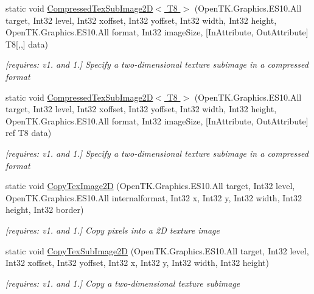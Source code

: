 \begin{DoxyCompactItemize}
static void \hyperlink{class_open_t_k_1_1_graphics_1_1_e_s10_1_1_g_l_ad5d51cd32ee94282e33250f4af2bd974}{Compressed\-Tex\-Sub\-Image2\-D$<$ T8 $>$} (Open\-T\-K.\-Graphics.\-E\-S10.\-All target, Int32 level, Int32 xoffset, Int32 yoffset, Int32 width, Int32 height, Open\-T\-K.\-Graphics.\-E\-S10.\-All format, Int32 image\-Size, \mbox{[}In\-Attribute, Out\-Attribute\mbox{]} T8\mbox{[},,\mbox{]} data)
\begin{DoxyCompactList}\small\item\em \mbox{[}requires\-: v1. and 1.\mbox{]} Specify a two-\/dimensional texture subimage in a compressed format \end{DoxyCompactList}\item 
static void \hyperlink{class_open_t_k_1_1_graphics_1_1_e_s10_1_1_g_l_aba823d2aca18dcc4fc7dff618af1efea}{Compressed\-Tex\-Sub\-Image2\-D$<$ T8 $>$} (Open\-T\-K.\-Graphics.\-E\-S10.\-All target, Int32 level, Int32 xoffset, Int32 yoffset, Int32 width, Int32 height, Open\-T\-K.\-Graphics.\-E\-S10.\-All format, Int32 image\-Size, \mbox{[}In\-Attribute, Out\-Attribute\mbox{]} ref T8 data)
\begin{DoxyCompactList}\small\item\em \mbox{[}requires\-: v1. and 1.\mbox{]} Specify a two-\/dimensional texture subimage in a compressed format \end{DoxyCompactList}\item 
static void \hyperlink{class_open_t_k_1_1_graphics_1_1_e_s10_1_1_g_l_a3811ae0fd1303feff2f1e4359d52b6f3}{Copy\-Tex\-Image2\-D} (Open\-T\-K.\-Graphics.\-E\-S10.\-All target, Int32 level, Open\-T\-K.\-Graphics.\-E\-S10.\-All internalformat, Int32 x, Int32 y, Int32 width, Int32 height, Int32 border)
\begin{DoxyCompactList}\small\item\em \mbox{[}requires\-: v1. and 1.\mbox{]} Copy pixels into a 2\-D texture image \end{DoxyCompactList}\item 
static void \hyperlink{class_open_t_k_1_1_graphics_1_1_e_s10_1_1_g_l_a41d89fb93ad1d93d864ae3761355c18a}{Copy\-Tex\-Sub\-Image2\-D} (Open\-T\-K.\-Graphics.\-E\-S10.\-All target, Int32 level, Int32 xoffset, Int32 yoffset, Int32 x, Int32 y, Int32 width, Int32 height)
\begin{DoxyCompactList}\small\item\em \mbox{[}requires\-: v1. and 1.\mbox{]} Copy a two-\/dimensional texture subimage \end{DoxyCompactList}\item 

\end{DoxyCompactItemize}
